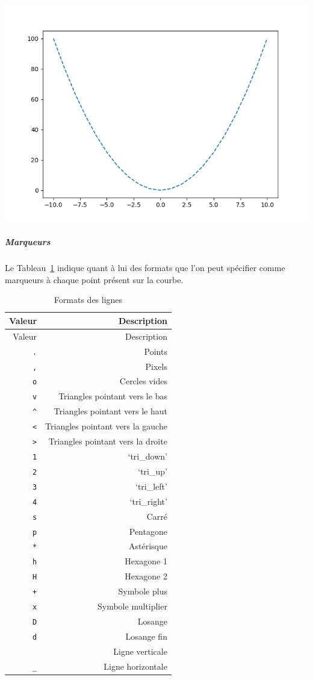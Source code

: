 \documentclass[12pt,]{book}
\let\oldsubparagraph\subparagraph
\renewcommand{\subparagraph}[1]{\oldsubparagraph{#1}\mbox{}}
\numberwithin{equation}{section}
\numberwithin{countremarque}{section}
\begin{document}
\begin{center}\includegraphics[width=9.03in]{figs/pyplot/lignes_linestyle} \end{center}

\subparagraph{Marqueurs}\label{marqueurs}

Le Tableau~\ref{tab:fmt-lignes-marqueurs} indique quant à lui des
formats que l'on peut spécifier comme marqueurs à chaque point présent
sur la courbe.

\begin{longtable}[]{@{}rr@{}}
\caption{\label{tab:fmt-lignes-marqueurs} Formats des lignes}\tabularnewline
\toprule
Valeur & Description\tabularnewline
\midrule
\endfirsthead
\toprule
Valeur & Description\tabularnewline
\midrule
\endhead
\texttt{.} & Points\tabularnewline
\texttt{,} & Pixels\tabularnewline
\texttt{o} & Cercles vides\tabularnewline
\texttt{v} & Triangles pointant vers le bas\tabularnewline
\texttt{\^{}} & Triangles pointant vers le haut\tabularnewline
\texttt{\textless{}} & Triangles pointant vers la gauche\tabularnewline
\texttt{\textgreater{}} & Triangles pointant vers la
droite\tabularnewline
\texttt{1} & `tri\_down'\tabularnewline
\texttt{2} & `tri\_up'\tabularnewline
\texttt{3} & `tri\_left'\tabularnewline
\texttt{4} & `tri\_right'\tabularnewline
\texttt{s} & Carré\tabularnewline
\texttt{p} & Pentagone\tabularnewline
\texttt{*} & Astérisque\tabularnewline
\texttt{h} & Hexagone 1\tabularnewline
\texttt{H} & Hexagone 2\tabularnewline
\texttt{+} & Symbole plus\tabularnewline
\texttt{x} & Symbole multiplier\tabularnewline
\texttt{D} & Losange\tabularnewline
\texttt{d} & Losange fin\tabularnewline
\texttt{\textbar{}} & Ligne verticale\tabularnewline
\texttt{\_} & Ligne horizontale\tabularnewline
\bottomrule
\end{longtable}
\end{document}
